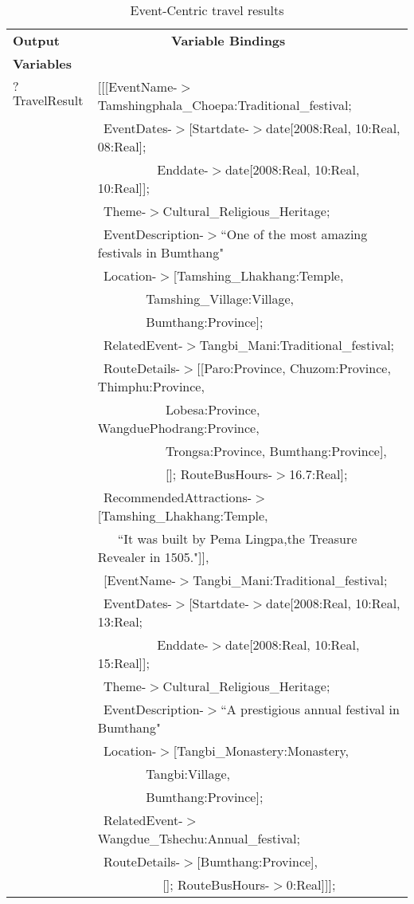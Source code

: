 \begin{table} [tbph]
\caption{Event-Centric travel results}
\centering
\footnotesize
\begin{tabular}{|l|l|}
\hline
 \textbf{Output} &$~~~~~~~~~~~~~~~~~~~~~~~~~~$\textbf{Variable Bindings} \\
 \textbf{Variables}&                \\
\hline
 $?$TravelResult&\cellcolor{yellow}[[[EventName-$>$Tamshingphala\_Choepa:Traditional\_festival;\\
  		 &$~~$EventDates-$>$[Startdate-$>$date[2008:Real, 10:Real, 08:Real];\\
		    &$~~~~~~~~~~~~~~~~~~~~~$Enddate-$>$date[2008:Real, 10:Real, 10:Real]];\\
			  &$~~$Theme-$>$Cultural\_Religious\_Heritage;\\
			  &$~~$EventDescription-$>$``One of the most amazing festivals in Bumthang"\\
		  	  &$~~$Location-$>$[Tamshing\_Lhakhang:Temple, \\
		  	  &$~~~~~~~~~~~~~~~~~$Tamshing\_Village:Village,\\ 
		  	  &$~~~~~~~~~~~~~~~~~$Bumthang:Province];\\
			  &$~~$RelatedEvent-$>$Tangbi\_Mani:Traditional\_festival;\\
			&$~~${\color{blue}RouteDetails}-$>$[[Paro:Province, Chuzom:Province, Thimphu:Province,\\
      &$~~~~~~~~~~~~~~~~~~~~~~~~$Lobesa:Province, WangduePhodrang:Province, \\ 
			&$~~~~~~~~~~~~~~~~~~~~~~~~$Trongsa:Province, Bumthang:Province], \\
			&$~~~~~~~~~~~~~~~~~~~~~~~~$[]; RouteBusHours-$>$16.7:Real];\\
						
		   &$~~${\color{blue}RecommendedAttractions}-$>$[Tamshing\_Lhakhang:Temple, \\
		   &$~~~~~~~$``It was built by Pema Lingpa,the Treasure Revealer in 1505."]],\\
         &$~~$\cellcolor{yellow}[EventName-$>$Tangbi\_Mani:Traditional\_festival;\\
  		 &$~~$EventDates-$>$[Startdate-$>$date[2008:Real, 10:Real, 13:Real;\\
		    &$~~~~~~~~~~~~~~~~~~~~~$Enddate-$>$date[2008:Real, 10:Real, 15:Real]];\\
			  &$~~$Theme-$>$Cultural\_Religious\_Heritage;\\
			  &$~~$EventDescription-$>$``A prestigious annual festival in Bumthang"\\
		  	  &$~~$Location-$>$[Tangbi\_Monastery:Monastery, \\
		  	  &$~~~~~~~~~~~~~~~~~$Tangbi:Village,\\ 
		  	  &$~~~~~~~~~~~~~~~~~$Bumthang:Province];\\
			  &$~~$RelatedEvent-$>$Wangdue\_Tshechu:Annual\_festival; \\
			&$~~${\color{blue}RouteDetails}-$>$[Bumthang:Province],  \\
      &$~~~~~~~~~~~~~~~~~~~~~~~$[]; RouteBusHours-$>$0:Real]]]; \\ 
									

\end{tabular}
\end{table}
